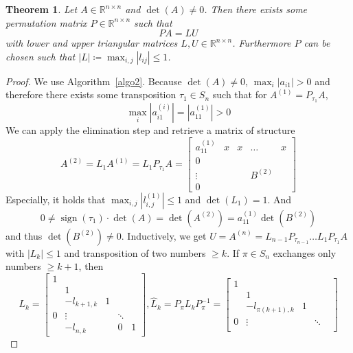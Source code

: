 \documentclass[a4paper]{article}
\newcounter{lecref}[section]
\numberwithin{lecref}{section}
\theoremstyle{break}
\newtheorem{thm}[lecref]{Theorem}
\newcommand{\Abs}[1]{\left|#1\right|}
\DeclareMathOperator{\sign}{sign}
\begin{document}
\begin{thm} %
  Let $A \in \mathbb R^{n \times n}$ and $\det(A) \neq 0$. Then there exists some permutation matrix $P \in \mathbb R^{n \times n}$ such that
  \[ PA = LU \]
  with lower and upper triangular matrices $L, U \in \mathbb R^{n \times n}$. Furthermore $P$ can be chosen such that $\Abs{L} \coloneqq \max_{i,j} \Abs{l_{ij}} \leq 1$.
\end{thm}
\begin{proof}
  We use Algorithm~\ref{algo2}. Because $\det(A) \neq 0$, $\max_i{\Abs{a_{i1}}} > 0$ and therefore there exists some transposition $\tau_1 \in S_n$ such that for $A^{(1)} = P_{\tau_1} A$,
  \[ \max_i \Abs{a_{i1}^{(i)}} = \Abs{a_{11}^{(1)}} > 0 \]
  We can apply the elimination step and retrieve a matrix of structure
  \[
    A^{(2)} = L_1 A^{(1)} = L_1 P_{\tau_1} A = \begin{bmatrix}
      a_{11}^{(1)} & x & x & \dots & x \\
    \hline
      0            &   &   &       & \\
      \vdots       &   &   & B^{(2)} & \\
      0            &   &   &       &
    \end{bmatrix}
  \]
  Especially, it holds that $\max_{i,j} \Abs{l_{i,j}^{(1)}} \leq 1$ and $\det(L_1) = 1$. And
  \[ 0 \neq \sign(\tau_1) \cdot \det(A) = \det(A^{(2)}) = a_{11}^{(1)} \det(B^{(2)}) \]
  and thus $\det(B^{(2)}) \neq 0$. Inductively, we get $U = A^{(n)} = L_{n-1} P_{\tau_{n-1}} \dots L_1 P_{\tau_1} A$
  with $\Abs{L_k} \leq 1$ and transposition of two numbers $\geq k$.
  If $\pi \in S_n$  exchanges only numbers $\geq k+1$, then
  \[
    L_k = \begin{bmatrix}
      1 &            &   &        & \\
        & 1          &   &        & \\
        & -l_{k+1,k} & 1 &        & \\
      0 & \vdots     &   & \ddots & \\
        & -l_{n,k}    &   & 0      & 1
    \end{bmatrix},
    \hat{L}_k = P_{\pi} L_k P_{\pi}^{-1}
    = \begin{bmatrix}
      1 &            &   &        & \\
        & 1          &   &        & \\
        & -l_{\pi(k+1),k} & 1 &        & \\
      0 & \vdots     &   & \ddots & \\

\end{bmatrix}\]
\end{proof}
\end{document}
